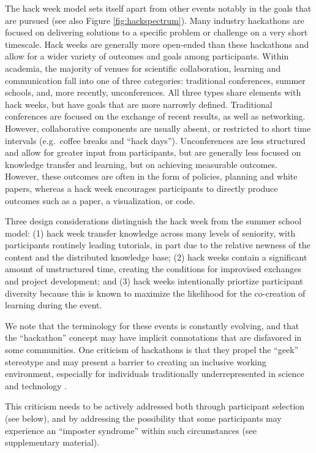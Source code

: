 The hack week model sets itself apart from other events notably in the goals that are pursued (see also Figure \ref{fig:hackspectrum}). Many industry hackathons are focused on delivering solutions to a specific problem or challenge on a very short timescale. Hack weeks are generally more open-ended than these hackathons and allow for a wider variety of outcomes and goals among participants. Within academia, the majority of venues for scientific collaboration, learning and communication fall into one of three categories: traditional conferences, summer schools, and, more recently, unconferences. All three types share elements with hack weeks, but have goals that are more narrowly defined. Traditional conferences are focused on the exchange of recent results, as well as networking. However, collaborative components are usually absent, or restricted to short time intervals (e.g.\ coffee breaks and ``hack days''). Unconferences are less structured and allow for greater input from participants, but are generally less focused on knowledge transfer and learning, but on achieving measurable outcomes. However, these outcomes are often in the form of policies, planning and white papers, whereas a hack week encourages participants to directly produce outcomes such as a paper, a visualization, or code. 

Three design considerations distinguish the hack week from the summer school model: (1) hack week transfer knowledge across many levels of seniority, with participants routinely leading tutorials, in part due to the relative newness of the content and the distributed knowledge base; (2) hack weeks contain a significant amount of unstructured time, creating the conditions for improvised exchanges and project development; and (3) hack weeks intentionally priortize participant diversity because this is known to maximize the likelihood for the co-creation of learning during the event.  

We note that the terminology for these events is constantly evolving, and that the ``hackathon'' concept may have implicit connotations that are disfavored in some communities.
One criticism of hackathons is that they propel the ``geek'' stereotype and may present a barrier to creating an inclusive working environment, especially for individuals traditionally underrepresented in science and technology \cite{Decker2015}.

This criticism needs to be actively addressed both through participant selection (see below), and by addressing the possibility that some participants may experience an ``imposter syndrome'' within such circumstances \cite{clance1978imposter} (see supplementary material).
